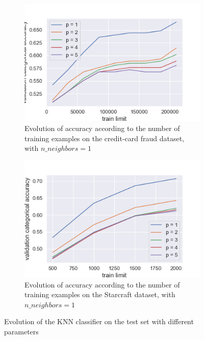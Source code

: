 \documentclass[twocolumn, a4paper, 10pt]{article}
\begin{document}
\begin{figure}
\begin{subfigure}[]{0.8\columnwidth}
				\centering
				\includegraphics[width=\linewidth]{../graphics/knn_creditcard_train_limit.png}
				\caption{Evolution of accuracy according to the number of training examples on the credit-card fraud dataset, with $n\_neighbors=1$}
				\label{knn:knn_cc_train_limit}
			\end{subfigure}
			\begin{subfigure}[]{0.8\columnwidth}
				\centering
				\includegraphics[width=\linewidth]{../graphics/knn_starcraft_train_limit.png}
				\caption{Evolution of accuracy according to the number of training examples on the Starcraft dataset, with $n\_neighbors=1$}
				\label{knn:knn_sc_train_limit}
			\end{subfigure}
			\caption{Evolution of the KNN classifier on the test set with different parameters}
			\label{knn:knn}
		\end{figure}
\end{document}
